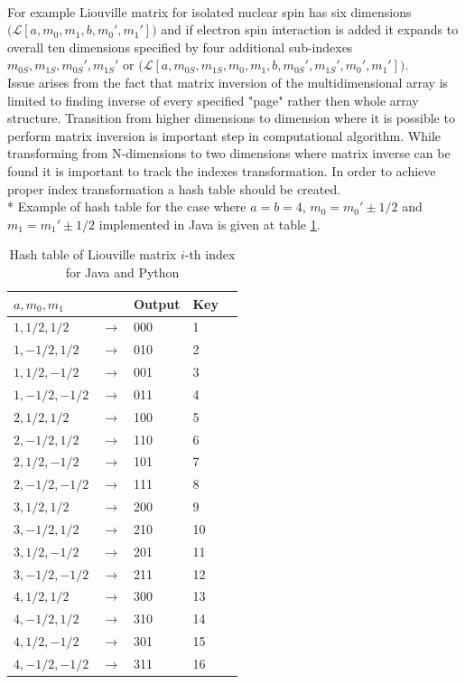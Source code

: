 \\
For example Liouville matrix for isolated nuclear spin has six dimensions $\Big(\mathcal{L}[a,m_0,m_1,b,m_0',m_1']\Big)$ and if electron spin interaction is added it expands to overall ten dimensions specified by four additional sub-indexes $m_{0S},m_{1S},m_{0S}',m_{1S}'$ or $\Big(\mathcal{L}[a,m_{0S},m_{1S},m_0,m_1,b,m_{0S}',m_{1S}',m_0',m_1']\Big)$. \\
Issue arises from the fact that matrix inversion of the multidimensional array is limited to finding inverse of every specified "page" rather then whole array structure. Transition from higher dimensions to dimension where it is possible to perform matrix inversion is important step in computational algorithm. While transforming from N-dimensions to two dimensions where matrix inverse can be found it is important to track the indexes transformation. In order to achieve proper index transformation a hash table should be created. \\*
 Example of hash table for the case where $a=b=4$, $m_0=m_0'\pm1/2$ and $m_1=m_1'\pm1/2$ implemented in Java is given at table \ref{table:kysymys}. 

\begin{table}[h!]
\begin{center}
    \begin{tabular}{  l  l  l  l l }
    \hline
    $a,m_0,m_1$ &  & Output & Key\\ \hline
    $1,1/2,1/2$ & $\rightarrow$ & 000 & 1 \\ \hline
    $1,-1/2,1/2$ & $\rightarrow$ & 010 & 2  \\ \hline
    $1,1/2,-1/2$ & $\rightarrow$ & 001 & 3 \\ \hline
  	$1,-1/2,-1/2$ & $\rightarrow$ & 011  & 4\\ \hline
    $2,1/2,1/2$ & $\rightarrow$ & 100 & 5 \\ \hline
    $2,-1/2,1/2$ & $\rightarrow$ & 110 & 6  \\ \hline
    $2,1/2,-1/2$ & $\rightarrow$ & 101 & 7 \\ \hline
  	$2,-1/2,-1/2$ & $\rightarrow$ & 111  & 8\\ \hline
  	$3,1/2,1/2$ & $\rightarrow$ & 200 & 9 \\ \hline
    $3,-1/2,1/2$ & $\rightarrow$ & 210 & 10  \\ \hline
    $3,1/2,-1/2$ & $\rightarrow$ & 201 & 11 \\ \hline
  	$3,-1/2,-1/2$ & $\rightarrow$ & 211  & 12\\ \hline
  	$4,1/2,1/2$ & $\rightarrow$ & 300 & 13 \\ \hline
    $4,-1/2,1/2$ & $\rightarrow$ & 310 & 14  \\ \hline
    $4,1/2,-1/2$ & $\rightarrow$ & 301 & 15 \\ \hline
  	$4,-1/2,-1/2$ & $\rightarrow$ & 311  & 16\\ \hline

    \end{tabular}
\end{center}
\caption{Hash table of Liouville matrix $i$-th index for Java and Python}
\label{table:kysymys}
\end{table}

